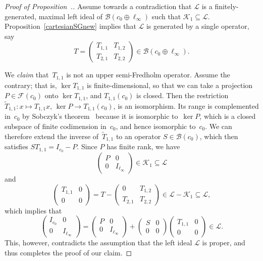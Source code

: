 \documentclass[12pt]{amsart}
\theoremstyle{definition}
\numberwithin{equation}{section}
\begin{document}
\begin{proof}[Proof of
  Proposition~{\normalfont{\ref{propK1notinfgmaxleftideal}}}.]
  Assume towards a contradiction that $\mathscr{L}$ is a
  finite\-ly-generated, maximal left ideal of
  \mbox{$\mathscr{B}(c_0\oplus\ell_\infty)$} such that
  $\mathscr{K}_1\subseteq\mathscr{L}$.
  Proposition~\ref{cartesianSGnew} implies that $\mathscr{L}$ is
  generated by a single operator, say
  \[ T = \begin{pmatrix} T_{1,1} & T_{1,2}\\ T_{2,1} &
    T_{2,2} \end{pmatrix}\in\mathscr{B}(c_0\oplus\ell_\infty).  \] 

  We \emph{claim} that~$T_{1,1}$ is not an upper semi-Fredholm
  operator. Assume the contrary; that is, $\ker T_{1,1}$ is
  finite-dimensional, so that we can take a
  projection~$P\in\mathscr{F}(c_0)$ onto $\ker T_{1,1}$, and
  $T_{1,1}(c_0)$ is closed. Then the restriction
  $\widetilde{T}_{1,1}\colon x\mapsto T_{1,1}x,\, \ker P\to
  T_{1,1}(c_0)$, is an isomorphism. Its range is complemented in~$c_0$
  by Sobczyk's theorem~\cite{sob} because it is isomorphic to~$\ker
  P$, which is a closed subspace of finite codimension in~$c_0$, and
  hence isomorphic to~$c_0$.  We can therefore extend the inverse
  of~$\widetilde{T}_{1,1}$ to an operator $S\in\mathscr{B}(c_0)$,
  which then satisfies $ST_{1,1} = I_{c_0} - P$. Since $P$ has finite
  rank, we have
  \[ \begin{pmatrix} P & 0 \\ 0 &
    I_{\ell_\infty} \end{pmatrix}\in\mathscr{K}_1\subseteq
  \mathscr{L}\] and \[
  \begin{pmatrix} T_{1,1} & 0 \\ 0 & 0 \end{pmatrix} = T
  - \begin{pmatrix} 0 & T_{1,2}\\ T_{2,1} &
    T_{2,2} \end{pmatrix}\in\mathscr{L} -
  \mathscr{K}_1\subseteq\mathscr{L}, \] which implies that
  \[ \begin{pmatrix} I_{c_0} & 0 \\ 0 & I_{\ell_\infty} \end{pmatrix}
  = \begin{pmatrix} P & 0 \\ 0 & I_{\ell_\infty} \end{pmatrix}
  + \begin{pmatrix} S & 0 \\ 0 & 0 \end{pmatrix}
  \begin{pmatrix} T_{1,1} & 0 \\ 0 & 0 \end{pmatrix}\in\mathscr{L}. \]
  This, however, contradicts the assumption that the left ideal
  $\mathscr{L}$ is proper, and thus completes the proof of our claim.


\end{proof}
\end{document}
